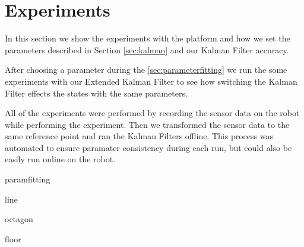 \documentclass[class=report, crop=false]{standalone}
\begin{document}
\chapter{Experiments}

In this section we show the experiments with the platform and how we set the parameters described in Section \ref{sec:kalman} and our Kalman Filter accuracy.

After choosing a parameter during the \ref{sec:parameterfitting} we run the some experiments with our Extended Kalman Filter to see how switching the Kalman Filter effects the states with the same parameters.

All of the experiments were performed by recording the sensor data on the robot while performing the experiment. Then we transformed the sensor data to the same reference point and ran the Kalman Filters offline. This process was automated to ensure paramater consistency during each run, but could also be easily run online on the robot.

{paramfitting}

{line}

{octagon}

{floor}
\end{document}
